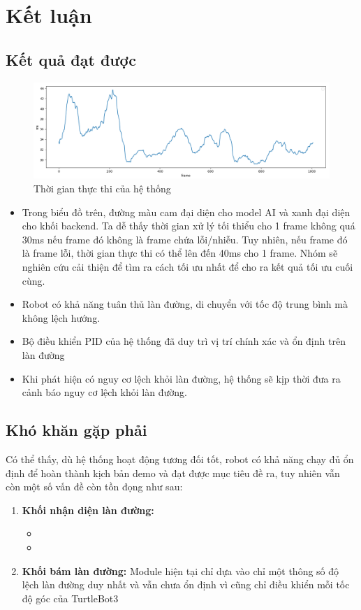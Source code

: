 \chapter{Kết luận}
\section{Kết quả đạt được}
\begin{figure}[!hbt]
\begin{center}
    \includegraphics[width=16cm]{img/5_Conclusion/performane_plot_2.png}
    \caption{Thời gian thực thi của hệ thống}
\end{center}
\end{figure}
\begin{itemize}
    \item Trong biểu đồ trên, đường màu cam đại diện cho model AI và xanh đại diện cho khối backend. Ta dễ thấy thời gian xử lý tối thiểu cho 1 frame không quá 30ms nếu frame đó không là frame chứa lỗi/nhiễu. Tuy nhiên, nếu frame đó là frame lỗi, thời gian thực thi có thể lên đến 40ms cho 1 frame. Nhóm sẽ nghiên cứu cải thiện để tìm ra cách tối ưu nhất để cho ra kết quả tối ưu cuối cùng.
    \item Robot có khả năng tuân thủ làn đường, di chuyển với tốc độ trung bình mà không lệch hướng.
    \item Bộ điều khiển PID của hệ thống đã duy trì vị trí chính xác và ổn định trên làn đường
    \item Khi phát hiện có nguy cơ lệch khỏi làn đường, hệ thống sẽ kịp thời đưa ra cảnh báo nguy cơ lệch khỏi làn đường.
    
\end{itemize}
\section{Khó khăn gặp phải}
Có thể thấy, dù hệ thống hoạt động tương đối tốt, robot có khả năng chạy đủ ổn định để hoàn thành kịch bản demo và đạt được mục tiêu đề ra, tuy nhiên vẫn còn một số vấn đề còn tồn đọng như sau:
\begin{enumerate}
    \item \textbf{Khối nhận diện làn đường:}
    \begin{itemize}
        \item 
        \item 
    \end{itemize}
    \item \textbf{Khối bám làn đường:} Module hiện tại chỉ dựa vào chỉ một thông số độ lệch làn đường duy nhất và vẫn chưa ổn định vì cũng chỉ điều khiển mỗi tốc độ góc của TurtleBot3
\end{enumerate}